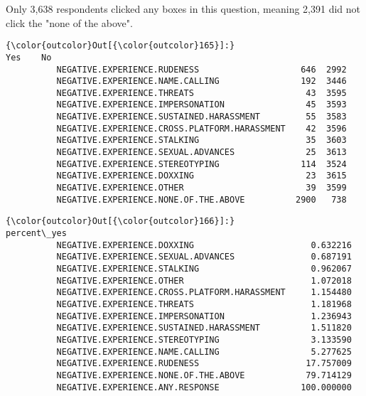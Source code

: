 \documentclass[11pt]{article}
\begin{document}
    Only 3,638 respondents clicked any boxes in this question, meaning 2,391
did not click the "none of the above".



            \begin{Verbatim}[commandchars=\\\{\}]
{\color{outcolor}Out[{\color{outcolor}165}]:}                                                 Yes    No
          NEGATIVE.EXPERIENCE.RUDENESS                    646  2992
          NEGATIVE.EXPERIENCE.NAME.CALLING                192  3446
          NEGATIVE.EXPERIENCE.THREATS                      43  3595
          NEGATIVE.EXPERIENCE.IMPERSONATION                45  3593
          NEGATIVE.EXPERIENCE.SUSTAINED.HARASSMENT         55  3583
          NEGATIVE.EXPERIENCE.CROSS.PLATFORM.HARASSMENT    42  3596
          NEGATIVE.EXPERIENCE.STALKING                     35  3603
          NEGATIVE.EXPERIENCE.SEXUAL.ADVANCES              25  3613
          NEGATIVE.EXPERIENCE.STEREOTYPING                114  3524
          NEGATIVE.EXPERIENCE.DOXXING                      23  3615
          NEGATIVE.EXPERIENCE.OTHER                        39  3599
          NEGATIVE.EXPERIENCE.NONE.OF.THE.ABOVE          2900   738
\end{Verbatim}
        

            \begin{Verbatim}[commandchars=\\\{\}]
{\color{outcolor}Out[{\color{outcolor}166}]:}                                                percent\_yes
          NEGATIVE.EXPERIENCE.DOXXING                       0.632216
          NEGATIVE.EXPERIENCE.SEXUAL.ADVANCES               0.687191
          NEGATIVE.EXPERIENCE.STALKING                      0.962067
          NEGATIVE.EXPERIENCE.OTHER                         1.072018
          NEGATIVE.EXPERIENCE.CROSS.PLATFORM.HARASSMENT     1.154480
          NEGATIVE.EXPERIENCE.THREATS                       1.181968
          NEGATIVE.EXPERIENCE.IMPERSONATION                 1.236943
          NEGATIVE.EXPERIENCE.SUSTAINED.HARASSMENT          1.511820
          NEGATIVE.EXPERIENCE.STEREOTYPING                  3.133590
          NEGATIVE.EXPERIENCE.NAME.CALLING                  5.277625
          NEGATIVE.EXPERIENCE.RUDENESS                     17.757009
          NEGATIVE.EXPERIENCE.NONE.OF.THE.ABOVE            79.714129
          NEGATIVE.EXPERIENCE.ANY.RESPONSE                100.000000
\end{Verbatim}
        

    \begin{center}
    \end{center}
    { \hspace*{\fill} \\}
    
\end{document}
